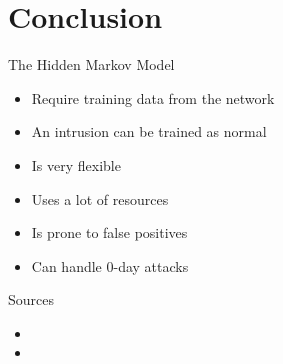 \section{Conclusion}
\begin{frame}
The Hidden Markov Model
	\begin{itemize}
		\item Require training data from the network
		\item An intrusion can be trained as normal 		
		\item Is very flexible
		\item Uses a lot of resources
		\item Is prone to false positives
		\item Can handle 0-day attacks
	\end{itemize}
\end{frame}

\begin{frame}
Sources
\end{frame}
\begin{itemize}
	\item
	\item
\end{itemize}

